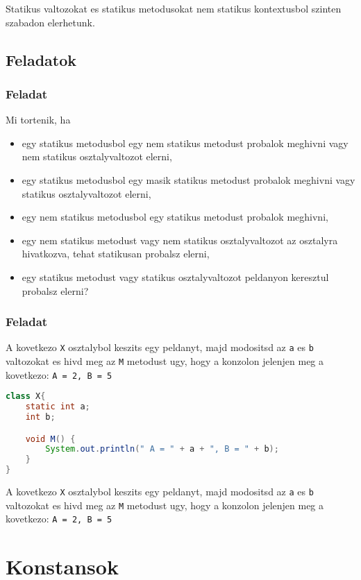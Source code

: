 \documentclass{article}
\let\l\lstinline
\begin{document}
Statikus valtozokat es statikus metodusokat nem
statikus kontextusbol szinten szabadon elerhetunk.

\newpage

\subsection{Feladatok}

\subsubsection{Feladat}
Mi tortenik, ha
\begin{itemize}
    \item egy statikus metodusbol egy nem statikus metodust probalok meghivni vagy nem statikus osztalyvaltozot elerni,
    \item egy statikus metodusbol egy masik statikus metodust probalok meghivni vagy statikus osztalyvaltozot elerni,
    \item egy nem statikus metodusbol egy statikus metodust probalok meghivni,
    \item egy nem statikus metodust vagy nem statikus osztalyvaltozot az osztalyra hivatkozva, tehat statikusan probalsz elerni,
    \item egy statikus metodust vagy statikus osztalyvaltozot peldanyon keresztul probalsz elerni?
\end{itemize}

\subsubsection{Feladat}

A kovetkezo \l{X} osztalybol keszits egy peldanyt, majd modositsd az \l{a} es \l{b} valtozokat es hivd meg az \l{M}
metodust ugy, hogy a konzolon jelenjen meg a kovetkezo: \l{A = 2, B = 5}

\begin{lstlisting}[language=Java, caption=Feladat]
class X{
    static int a;
    int b;

    void M() {
        System.out.println(" A = " + a + ", B = " + b);
    }
}
\end{lstlisting}

A kovetkezo \l{X} osztalybol keszits egy peldanyt, majd modositsd az \l{a} es \l{b} valtozokat es hivd meg az \l{M}
metodust ugy, hogy a konzolon jelenjen meg a kovetkezo: \l{A = 2, B = 5}

\newpage

\section{Konstansok}
\end{document}
